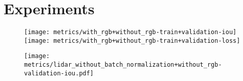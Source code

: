 \section{Experiments}%
\label{sec:experiments}

\begin{figure}[htb]
  \centering
  \texttt{[image: metrics/with\_rgb+without\_rgb-train+validation-iou]}
  \texttt{[image: metrics/with\_rgb+without\_rgb-train+validation-loss]}
\end{figure}

\begin{figure}[htb]
  \centering
  \texttt{[image: metrics/lidar\_without\_batch\_normalization+without\_rgb-validation-iou.pdf]}
\end{figure}

